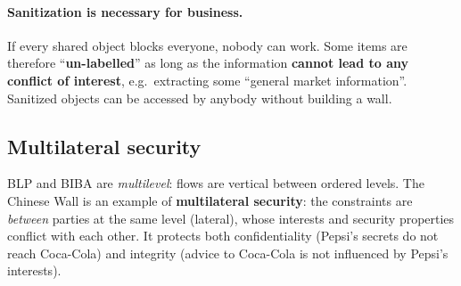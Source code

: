 \paragraph{Sanitization is necessary for business.} If every shared object blocks everyone, nobody can work. Some items are therefore ``\textbf{un-labelled}'' as long as the information \textbf{cannot lead to any conflict of interest}, e.g.\ extracting some ``general market information''. Sanitized objects can be accessed by anybody without building a wall.

\subsection{Multilateral security}

BLP and BIBA are \emph{multilevel}: flows are vertical between ordered levels. The Chinese Wall is an example of \textbf{multilateral security}: the constraints are \emph{between} parties at the same level (lateral), whose interests and security properties conflict with each other. It protects both confidentiality (Pepsi's secrets do not reach Coca-Cola) and integrity (advice to Coca-Cola is not influenced by Pepsi's interests).
